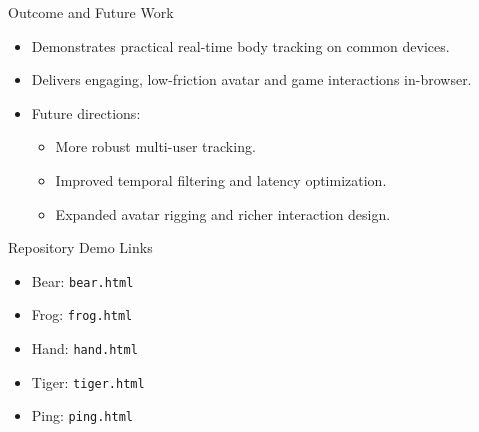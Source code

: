 \documentclass[aspectratio=169]{beamer}
\begin{document}
\begin{frame}{Outcome and Future Work}
  \begin{itemize}
    \item Demonstrates practical real-time body tracking on common devices.
    \item Delivers engaging, low-friction avatar and game interactions in-browser.
    \item Future directions:
    \begin{itemize}
      \item More robust multi-user tracking.
      \item Improved temporal filtering and latency optimization.
      \item Expanded avatar rigging and richer interaction design.
    \end{itemize}
  \end{itemize}
\end{frame}

\begin{frame}{Repository Demo Links}
  \small
  \begin{itemize}
    \item Bear: \texttt{bear.html}
    \item Frog: \texttt{frog.html}
    \item Hand: \texttt{hand.html}
    \item Tiger: \texttt{tiger.html}
    \item Ping: \texttt{ping.html}
  \end{itemize}
\end{frame}
\end{document}
